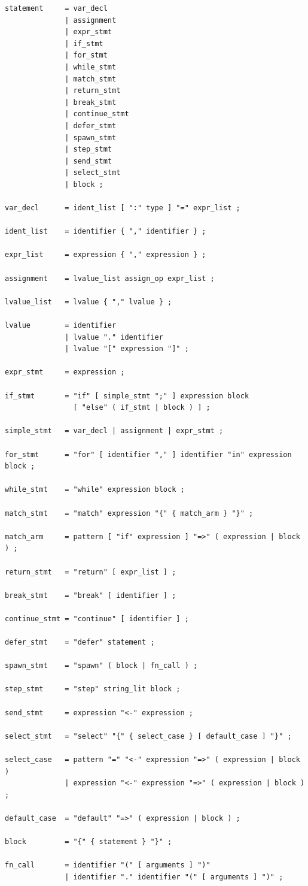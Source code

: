 \begin{lstlisting}[language=EBNF]
statement     = var_decl
              | assignment
              | expr_stmt
              | if_stmt
              | for_stmt
              | while_stmt
              | match_stmt
              | return_stmt
              | break_stmt
              | continue_stmt
              | defer_stmt
              | spawn_stmt
              | step_stmt
              | send_stmt
              | select_stmt
              | block ;

var_decl      = ident_list [ ":" type ] "=" expr_list ;

ident_list    = identifier { "," identifier } ;

expr_list     = expression { "," expression } ;

assignment    = lvalue_list assign_op expr_list ;

lvalue_list   = lvalue { "," lvalue } ;

lvalue        = identifier
              | lvalue "." identifier
              | lvalue "[" expression "]" ;

expr_stmt     = expression ;

if_stmt       = "if" [ simple_stmt ";" ] expression block
                [ "else" ( if_stmt | block ) ] ;

simple_stmt   = var_decl | assignment | expr_stmt ;

for_stmt      = "for" [ identifier "," ] identifier "in" expression block ;

while_stmt    = "while" expression block ;

match_stmt    = "match" expression "{" { match_arm } "}" ;

match_arm     = pattern [ "if" expression ] "=>" ( expression | block ) ;

return_stmt   = "return" [ expr_list ] ;

break_stmt    = "break" [ identifier ] ;

continue_stmt = "continue" [ identifier ] ;

defer_stmt    = "defer" statement ;

spawn_stmt    = "spawn" ( block | fn_call ) ;

step_stmt     = "step" string_lit block ;

send_stmt     = expression "<-" expression ;

select_stmt   = "select" "{" { select_case } [ default_case ] "}" ;

select_case   = pattern "=" "<-" expression "=>" ( expression | block )
              | expression "<-" expression "=>" ( expression | block ) ;

default_case  = "default" "=>" ( expression | block ) ;

block         = "{" { statement } "}" ;

fn_call       = identifier "(" [ arguments ] ")"
              | identifier "." identifier "(" [ arguments ] ")" ;
\end{lstlisting}

